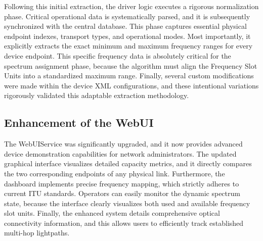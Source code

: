 \documentclass[12pt, a4paper, twoside, openright]{report}
\begin{document}
Following this initial extraction, the driver logic executes a rigorous normalization phase. Critical operational data is systematically parsed, and it is subsequently synchronized with the central database. This phase captures essential physical endpoint indexes, transport types, and operational modes. Most importantly, it explicitly extracts the exact minimum and maximum frequency ranges for every device endpoint. This specific frequency data is absolutely critical for the spectrum assignment phase, because the algorithm must align the Frequency Slot Units into a standardized maximum range. Finally, several custom modifications were made within the device XML configurations, and these intentional variations rigorously validated this adaptable extraction methodology.
\subsection{Enhancement of the WebUI}
The WebUIService was significantly upgraded, and it now provides advanced device demonstration capabilities for network administrators. The updated graphical interface visualizes detailed capacity metrics, and it directly compares the two corresponding endpoints of any physical link. Furthermore, the dashboard implements precise frequency mapping, which strictly adheres to current ITU standards. Operators can easily monitor the dynamic spectrum state, because the interface clearly visualizes both used and available frequency slot units. Finally, the enhanced system details comprehensive optical connectivity information, and this allows users to efficiently track established multi-hop lightpaths.
\end{document}
